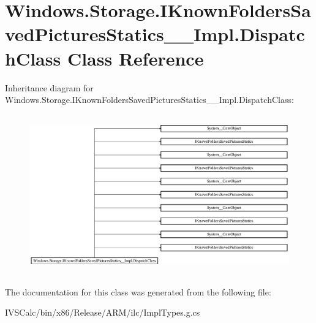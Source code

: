 \hypertarget{class_windows_1_1_storage_1_1_i_known_folders_saved_pictures_statics_____impl_1_1_dispatch_class}{}\section{Windows.\+Storage.\+I\+Known\+Folders\+Saved\+Pictures\+Statics\+\_\+\+\_\+\+Impl.\+Dispatch\+Class Class Reference}
\label{class_windows_1_1_storage_1_1_i_known_folders_saved_pictures_statics_____impl_1_1_dispatch_class}
Inheritance diagram for Windows.\+Storage.\+I\+Known\+Folders\+Saved\+Pictures\+Statics\+\_\+\+\_\+\+Impl.\+Dispatch\+Class\+:\begin{figure}[H]
\begin{center}
\leavevmode
\includegraphics[height=6.921349cm]{class_windows_1_1_storage_1_1_i_known_folders_saved_pictures_statics_____impl_1_1_dispatch_class}
\end{center}
\end{figure}


The documentation for this class was generated from the following file\+:\begin{DoxyCompactItemize}
\item 
I\+V\+S\+Calc/bin/x86/\+Release/\+A\+R\+M/ilc/Impl\+Types.\+g.\+cs\end{DoxyCompactItemize}
